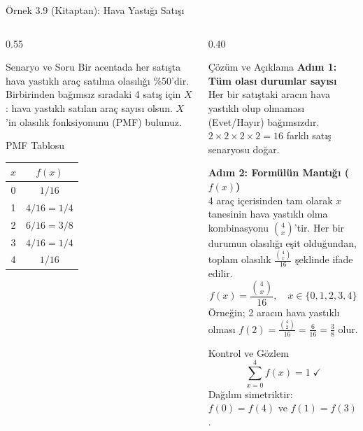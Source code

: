 \documentclass[light]{lutbeamer}
\begin{document}
\begin{frame}{Örnek 3.9 (Kitaptan): Hava Yastığı Satışı}
\footnotesize
\begin{columns}[T]
  \begin{column}{0.55\textwidth}
    \begin{block}{Senaryo ve Soru}
      Bir acentada her satışta hava yastıklı araç satılma olasılığı \%50'dir.
      Birbirinden bağımsız sıradaki 4 satış için
      $X$: hava yastıklı satılan araç sayısı olsun.
      $X$'in olasılık fonksiyonunu (PMF) bulunuz.
    \end{block}

    \begin{block}{PMF Tablosu}
      \centering
      \begin{tabular}{cc}
        \toprule
        $x$ & $f(x)$ \\
        \midrule
        0 & $1/16$ \\
        1 & $4/16 = 1/4$ \\
        2 & $6/16 = 3/8$ \\
        3 & $4/16 = 1/4$ \\
        4 & $1/16$ \\
        \bottomrule
      \end{tabular}
    \end{block}
  \end{column}
  \begin{column}{0.40\textwidth}
    \begin{alertblock}{Çözüm ve Açıklama}
      \textbf{Adım 1: Tüm olası durumlar sayısı}\\
      Her bir satıştaki aracın hava yastıklı olup olmaması (Evet/Hayır) bağımsızdır. $2 \times 2 \times 2 \times 2 = 16$ farklı satış senaryosu doğar.

      \textbf{Adım 2: Formülün Mantığı ($f(x)$)}\\
      4 araç içerisinden tam olarak $x$ tanesinin hava yastıklı olma kombinasyonu $\binom{4}{x}$'tir. Her bir durumun olasılığı eşit olduğundan, toplam olasılık $\frac{\binom{4}{x}}{16}$ şeklinde ifade edilir.
      \[
      f(x) = \frac{\binom{4}{x}}{16}, \quad x \in \{0, 1, 2, 3, 4\}
      \]
      Örneğin; 2 aracın hava yastıklı olması $f(2) = \frac{\binom{4}{2}}{16} = \frac{6}{16} = \frac{3}{8}$ olur.
    \end{alertblock}
    \begin{block}{Kontrol ve Gözlem}
      \[
      \sum_{x=0}^{4} f(x)=1 \;\checkmark
      \]
      Dağılım simetriktir: $f(0)=f(4)$ ve $f(1)=f(3)$.
    \end{block}
  \end{column}
\end{columns}
\end{frame}
\end{document}

